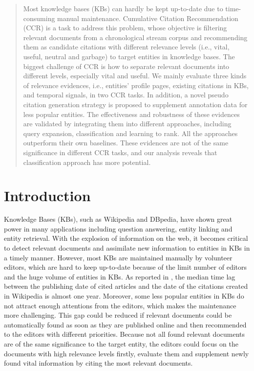 \documentclass{sig-alternate}
\begin{document}
\maketitle
\begin{abstract}
Most knowledge bases (KBs) can hardly be kept up-to-date due to time-consuming manual maintenance. Cumulative Citation Recommendation (CCR) is a task to address this problem, whose objective is filtering relevant documents from a chronological stream corpus and recommending them as candidate citations with different relevance levels (i.e., vital, useful, neutral and garbage) to target entities in knowledge bases. The biggest challenge of CCR is how to separate relevant documents into different levels, especially vital and useful.
We mainly evaluate three kinds of relevance evidences, i.e., entities' profile pages, existing citations in KBs, and temporal signals, in two CCR tasks. In addition, a novel pseudo citation generation strategy is proposed to supplement annotation data for less popular entities. The effectiveness and robustness of these evidences are validated by integrating them into different approaches, including query expansion, classification and learning to rank. All the approaches outperform their own baselines. These evidences are not of the same significance in different CCR tasks, and our analysis reveals that classification approach has more potential. 
\end{abstract}

\section{Introduction}\label{sec:intro}
Knowledge Bases (KBs), such as Wikipedia and DBpedia, have shown great power in many applications including question answering, entity linking and entity retrieval. With the explosion of information on the web, it becomes critical to detect relevant documents and assimilate new information to entities in KBs in a timely manner. However, most KBs are maintained manually by volunteer editors, which are hard to keep up-to-date because of the limit number of editors and the huge volume of entities in KBs. As reported in \cite{trec-kba-overview-2012}, the median time lag between the publishing date of cited articles and the date of the citations created in Wikipedia is almost one year. Moreover, some less popular entities in KBs do not attract enough attentions from the editors, which makes the maintenance more challenging. This gap could be reduced if relevant documents could be automatically found as soon as they are published online and then recommended to the editors with different priorities. Because not all found relevant documents are of the same significance to the target entity, the editors could focus on the documents with high relevance levels firstly, evaluate them and supplement newly found vital information by citing the most relevant documents.
\end{document}
